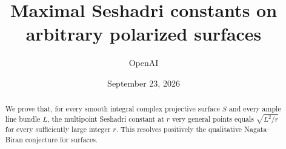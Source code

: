 
\title{Maximal Seshadri constants on arbitrary polarized surfaces}
\author{OpenAI}
\date{September 23, 2026}

\maketitle
\begin{abstract}
We prove that, for every smooth integral complex projective surface $S$
and every ample line bundle $L$, the multipoint Seshadri constant at $r$
very general points equals $\sqrt{L^2/r}$ for every sufficiently large
integer $r$. This resolves positively the qualitative Nagata--Biran
conjecture for surfaces.
\end{abstract}
\tableofcontents







\begingroup
\small

\endgroup

